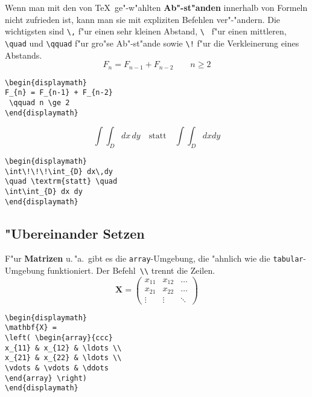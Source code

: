 Wenn man mit den von \TeX\ ge"-w"ahlten \textbf{Ab"-st"anden}
innerhalb von Formeln nicht zufrieden ist, kann man sie mit
expliziten Befehlen ver"-"andern. Die wichtigsten sind
\verb|\,| f"ur einen sehr kleinen Abstand,
\verb*|\ | f"ur einen mittleren,
\verb|\quad| und \verb|\qquad| f"ur gro"se Ab"-st"ande sowie
\verb|\!| f"ur die Verkleinerung eines Abstands.
\exa
\begin{displaymath}
F_{n} = F_{n-1} + F_{n-2}
 \qquad n \ge 2
\end{displaymath}
\exb
\begin{verbatim}
\begin{displaymath}
F_{n} = F_{n-1} + F_{n-2}
 \qquad n \ge 2
\end{displaymath}
\end{verbatim}
\exc
 
\exa
\begin{displaymath}
\int\!\!\!\int_{D} dx\,dy
\quad \textrm{statt} \quad
\int\int_{D} dx dy
\end{displaymath}
\exb
\begin{verbatim}
\begin{displaymath}
\int\!\!\!\int_{D} dx\,dy
\quad \textrm{statt} \quad
\int\int_{D} dx dy
\end{displaymath}
\end{verbatim}
\exc


\subsection{"Ubereinander Setzen}

F"ur \textbf{Matrizen} u.\,"a.\ gibt es die
\texttt{array}-Umgebung, die "ahnlich wie die
\texttt{tabular}-Umgebung funktioniert.
Der Befehl~\verb|\\| trennt die Zeilen.
\exa
\begin{displaymath}
\mathbf{X} =
\left( \begin{array}{ccc}
x_{11} & x_{12} & \ldots \\
x_{21} & x_{22} & \ldots \\
\vdots & \vdots & \ddots
\end{array} \right)
\end{displaymath}
\exb
\begin{verbatim}
\begin{displaymath}
\mathbf{X} =
\left( \begin{array}{ccc}
x_{11} & x_{12} & \ldots \\
x_{21} & x_{22} & \ldots \\
\vdots & \vdots & \ddots
\end{array} \right)
\end{displaymath}
\end{verbatim}
\exc

